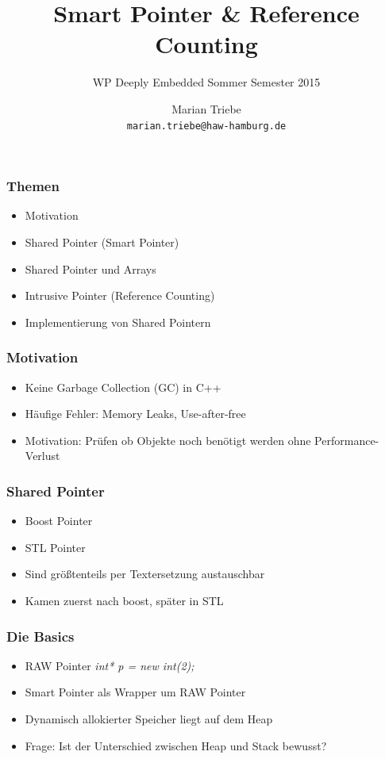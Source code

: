 \documentclass{beamer}
\title{Smart Pointer \& Reference Counting}
\author{
  Marian Triebe\\
  \tiny \texttt{marian.triebe@haw-hamburg.de}
}
\date{} %
\subtitle{WP Deeply Embedded Sommer Semester 2015}
\begin{document}
\begin{frame}
 \titlepage
\end{frame}
 
\begin{frame}
 \frametitle{Themen}
 \begin{itemize}
  \item Motivation
  \item Shared Pointer (Smart Pointer)
  \item Shared Pointer und Arrays
  \item Intrusive Pointer (Reference Counting)
  \item Implementierung von Shared Pointern
 \end{itemize}
\end{frame}

\begin{frame}
 \frametitle{Motivation}
 \begin{itemize}
 	\item Keine Garbage Collection (GC) in C++
 	\item Häufige Fehler: Memory Leaks, Use-after-free
 	\item Motivation: Prüfen ob Objekte noch benötigt werden ohne
 	Performance-Verlust
 \end{itemize}
\end{frame}


\begin{frame}
 \frametitle{Shared Pointer}
 \begin{itemize}
  \item Boost Pointer
  \item STL Pointer
  \item Sind größtenteils per Textersetzung austauschbar
  \item Kamen zuerst nach boost, später in STL
 \end{itemize}
\end{frame}

\begin{frame}
  \frametitle{Die Basics}
  \begin{itemize}
    \item RAW Pointer \textit{int* p = new int(2);}
    \item Smart Pointer als Wrapper um RAW Pointer
    \item Dynamisch allokierter Speicher liegt auf dem Heap
    \item Frage: Ist der Unterschied zwischen Heap und Stack bewusst?
  \end{itemize}	
\end{frame}
\end{document}
